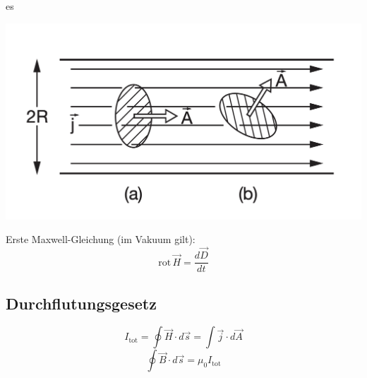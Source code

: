 es\documentclass[a4paper, fontsize=8pt, landscape]{scrartcl}
\begin{document}
\begin{multicols*}{4}
    \begin{center}
        \includegraphics[scale=0.2]{Images/Durchflutungsgesetz.png}
    \end{center}
    Erste Maxwell-Gleichung (im Vakuum gilt):
    \[\mathrm{rot}\,\vec H = \frac{d\vec D}{dt}\]

\subsection{Durchflutungsgesetz}
\[
I_{\text{tot}} = \oint \vec{H} \cdot d\vec{s} = \int \vec{j} \cdot d\vec{A}
\]
\[
\oint \vec{B} \cdot d\vec{s} = \mu_0 I_{\text{tot}}
\]




\end{multicols*}
\end{document}
